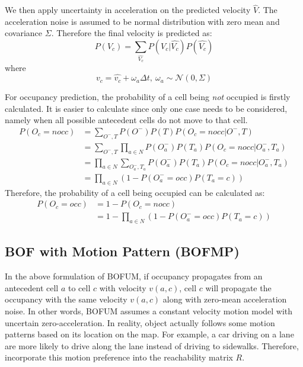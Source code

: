 We then apply uncertainty in acceleration on the predicted velocity $\hat{V}$. The acceleration noise is assumed to be normal distribution with zero mean and covariance $\Sigma$. Therefore the final velocity is predicted as:
\begin{equation}
P(V_c) = \sum_{\hat{V_c}}{P(V_c|\hat{V_c})P(\hat{V_c})} \label{eq:adding_noise}
\end{equation}
where
\begin{equation*}
v_c = \hat{v_c} + \omega_a \Delta t, \ \omega_a \sim \mathcal{N}(0, \Sigma)
\end{equation*}

For occupancy prediction, the probability of a cell being \textit{not} occupied is firstly calculated. It is easier to calculate since only one case needs to be considered, namely when all possible antecedent cells do not move to that cell.
\begin{align}
P(O_c=nocc) &= \sum_{O^-, T} P(O^-)P(T)P(O_c=nocc|O^-,T) \\
            &= \sum_{O^-, T}\prod_{a \in N} P(O_a^-)P(T_a)P(O_c=nocc|O^-_a,T_a) \\
            &= \prod_{a \in N} \sum_{O_a^-, T_a} P(O_a^-)P(T_a)P(O_c=nocc|O^-_a,T_a) \\
            &= \prod_{a \in N} (1-P(O_a^-=occ)P(T_a=c))
\end{align}
Therefore, the probability of a cell being occupied can be calculated as:
\begin{align}
P(O_c=occ) &= 1 - P(O_c=nocc) \\
           &= 1 - \prod_{a \in N}{(1-P(O_a^-=occ)P(T_a=c))}
\end{align}

\subsection{BOF with Motion Pattern (BOFMP)} \label{sec:bofmp}

In the above formulation of BOFUM, if occupancy propagates from an antecedent cell $a$ to cell $c$ with velocity $v(a,c)$, cell $c$ will propagate the occupancy with the same velocity $v(a,c)$ along with zero-mean acceleration noise. In other words, BOFUM assumes a constant velocity motion model with uncertain zero-acceleration. In reality, object actually follows some motion patterns based on its location on the map. For example, a car driving on a lane are more likely to drive along the lane instead of driving to sidewalks. Therefore, \citet{gindele2009bayesian} incorporate this motion preference into the reachability matrix $R$.

